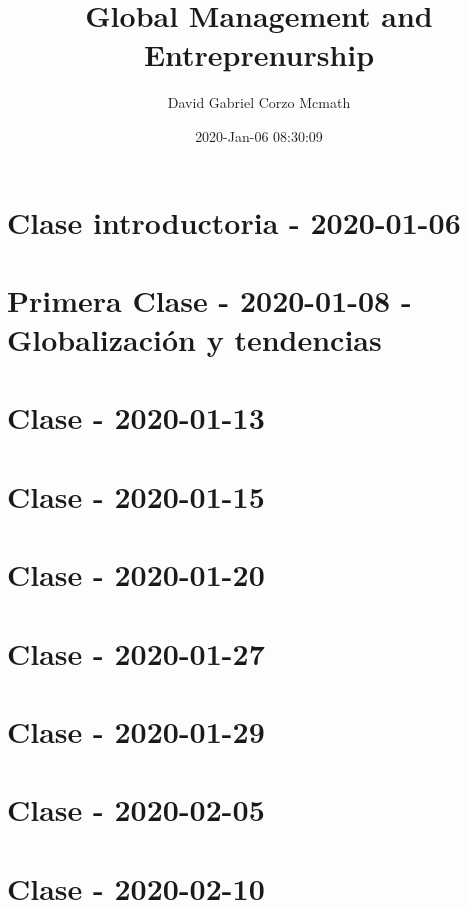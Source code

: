 \documentclass[openany]{book}
\title{Global Management and Entreprenurship}
\author{David Gabriel Corzo Mcmath}
\date{2020-Jan-06 08:30:09}
\begin{document}
\maketitle
\tableofcontents

\tikzblockdefinitions

\chapter{Clase introductoria - 2020-01-06}


\chapter{Primera Clase - 2020-01-08 - Globalización y tendencias}


\chapter{Clase - 2020-01-13}


\chapter{Clase - 2020-01-15}


\chapter{Clase - 2020-01-20}


\chapter{Clase - 2020-01-27}


\chapter{Clase - 2020-01-29}   


\chapter{Clase - 2020-02-05}


\chapter{Clase - 2020-02-10}

\end{document}
